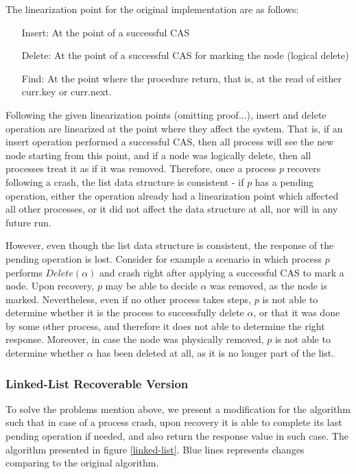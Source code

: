 The linearization point for the original implementation are as follows:
\begin{itemize}
	\item [Insert:] At the point of a successful CAS
	\item [Delete:] At the point of a successful CAS for marking the node (logical delete)
	\item [Find:] At the point where the procedure return, that is, at the read of either curr.key or curr.next.
\end{itemize}

Following the given linearization points (omitting proof...), insert and delete operation are linearized at the point where they affect the system. That is, if an insert operation performed a successful CAS, then all process will see the new node starting from this point, and if a node was logically delete, then all processes treat it as if it was removed. Therefore, once a process $p$ recovers following a crash, the list data structure is consistent - if $p$ has a pending operation, either the operation already had a linearization point which affected all other processes, or it did not affect the data structure at all, nor will in any future run.

However, even though the list data structure is consistent, the response of the pending operation is lost. Consider for example a scenario in which process $p$ performs $Delete(\alpha)$ and crash right after applying a successful CAS to mark a node. Upon recovery, $p$ may be able to decide $\alpha$ was removed, as the node is marked. Nevertheless, even if no other process takes steps, $p$ is not able to determine whether it is the process to successfully delete $\alpha$, or that it was done by some other process, and therefore it does not able to determine the right response. Moreover, in case the node was physically removed, $p$ is not able to determine whether $\alpha$ has been deleted at all, as it is no longer part of the list.


\subsubsection{Linked-List Recoverable Version}

To solve the problems mention above, we present a modification for the algorithm such that in case of a process crash, upon recovery it is able to complete its last pending operation if needed, and also return the response value in such case. The algorithm presented in figure \ref{linked-list}. Blue lines represents changes comparing to the original algorithm.


